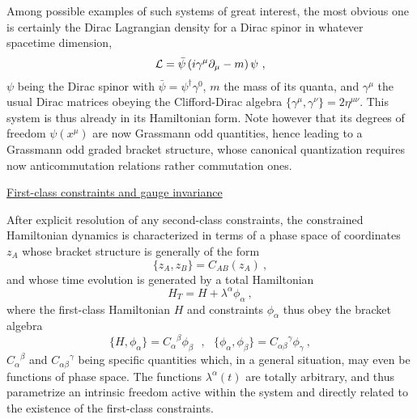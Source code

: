 \documentclass[a4paper,11pt]{article}
\begin{document}
Among possible examples of such systems of great interest, the most
obvious one is certainly the Dirac Lagrangian density for a Dirac spinor
in whatever spacetime dimension,
\begin{equation}
{\cal L}=\bar{\psi}\left(i\gamma^\mu\partial_\mu-m\right)\psi\ ,
\end{equation}
$\psi$ being the Dirac spinor with $\bar{\psi}=\psi^\dagger\gamma^0$,
$m$ the mass of its quanta, and $\gamma^\mu$ the usual Dirac
matrices obeying the Clifford-Dirac algebra 
$\{\gamma^\mu,\gamma^\nu\}=2\eta^{\mu\nu}$. This system is thus already
in its Hamiltonian form. Note however that its degrees of freedom $\psi(x^\mu)$
are now Grassmann odd quantities, hence leading to a Grassmann odd
graded bracket structure, whose canonical quantization requires now
anticommutation relations rather commutation ones.

\vspace{10pt}

\noindent\underline{First-class constraints and gauge invariance}

\vspace{5pt}

After explicit resolution of any second-class constraints, the constrained
Hamiltonian dynamics is characterized in terms of a phase space of coordinates
$z_A$ whose bracket structure is generally of the form
\begin{equation}
\{z_A,z_B\}=C_{AB}(z_A)\ ,
\end{equation}
and whose time evolution is generated by a total Hamiltonian
\begin{equation}
H_T=H+\lambda^\alpha\phi_\alpha\ ,
\end{equation}
where the first-class Hamiltonian $H$ and constraints $\phi_\alpha$ thus obey
the bracket algebra
\begin{equation}
\{H,\phi_\alpha\}={C_\alpha}^\beta\phi_\beta\ \ \ ,\ \ \ 
\{\phi_\alpha,\phi_\beta\}={C_{\alpha\beta}}^\gamma\phi_\gamma\ ,
\label{eq:gaugealgebra}
\end{equation}
${C_\alpha}^\beta$ and ${C_{\alpha\beta}}^\gamma$ being specific quantities
which, in a general situation, may even be functions of phase space.
The functions $\lambda^\alpha(t)$ are totally arbitrary,
and thus parametrize an intrinsic freedom active within the system and
directly related to the existence of the first-class constraints.
\end{document}
